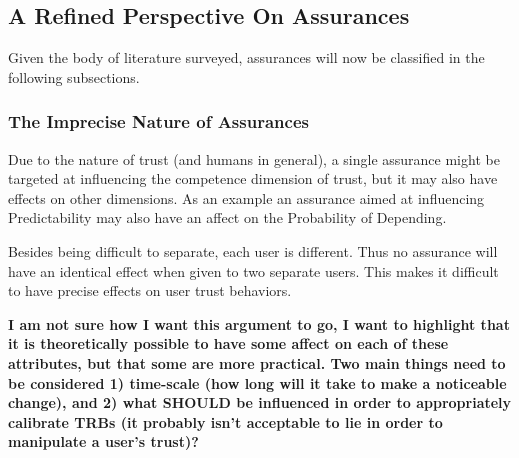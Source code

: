 \subsection{A Refined Perspective On Assurances}
Given the body of literature surveyed, assurances will now be classified in the following subsections.





\subsubsection{The Imprecise Nature of Assurances}\label{sec:imprecise}
    Due to the nature of trust (and humans in general), a single assurance might be targeted at influencing the competence dimension of trust, but it may also have effects on other dimensions. As an example an assurance aimed at influencing Predictability may also have an affect on the Probability of Depending.

    Besides being difficult to separate, each user is different. Thus no assurance will have an identical effect when given to two separate users. This makes it difficult to have precise effects on user trust behaviors.

    \textbf{I am not sure how I want this argument to go, I want to highlight that it is theoretically possible to have some affect on each of these attributes, but that some are more practical. Two main things need to be considered 1) time-scale (how long will it take to make a noticeable change), and 2) what SHOULD be influenced in order to appropriately calibrate TRBs (it probably isn't acceptable to lie in order to manipulate a user's trust)?}

